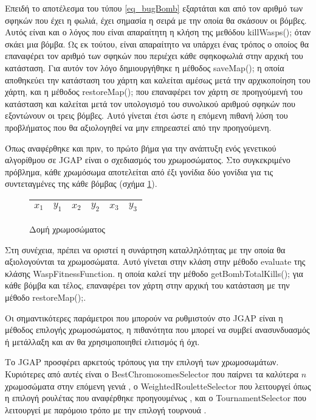 Επειδή το αποτέλεσμα του τύπου \ref{eq_bugBomb} εξαρτάται και από τον αριθμό των σφηκών που έχει η φωλιά, έχει σημασία η σειρά με την οποία θα σκάσουν οι βόμβες. Αυτός είναι και ο λόγος που είναι απαραίτητη η κλήση της μεθόδου killWasps(); όταν σκάει μια βόμβα. Ως εκ τούτου, είναι απαραίτητο να υπάρχει ένας τρόπος ο οποίος θα επαναφέρει τον αριθμό των σφηκών που περιέχει κάθε σφηκοφωλιά στην αρχική του κατάσταση. Για αυτόν τον λόγο δημιουργήθηκε η μέθοδος saveMap(); η οποία αποθηκεύει την κατάσταση του χάρτη και καλείται αμέσως μετά την αρχικοποίηση του χάρτη, και η μέθοδος restoreMap(); που επαναφέρει τον χάρτη σε προηγούμενή του κατάσταση και καλείται μετά τον υπολογισμό του συνολικού αριθμού σφηκών που εξοντώνουν οι τρεις βόμβες. Αυτό γίνεται έτσι ώστε η επόμενη πιθανή λύση του προβλήματος που θα αξιολογηθεί να μην επηρεαστεί από την προηγούμενη.

Όπως αναφέρθηκε και πριν, το πρώτο βήμα για την ανάπτυξη ενός γενετικού αλγορίθμου σε JGAP είναι ο σχεδιασμός του χρωμοσώματος. Στο συγκεκριμένο πρόβλημα, κάθε χρωμόσωμα αποτελείται από έξι γονίδια \textemdash{} δύο γονίδια για τις συντεταγμένες της κάθε βόμβας (σχήμα \ref{fig_chromosomeStructure}).

\begin{figure}[!t]
    \centering
    \begin{tabular}{|c|c|c|c|c|c|}
        \hline
        $x_1$ & $y_1$ & $x_2$ & $y_2$ & $x_3$ & $y_3$\\
        \hline
    \end{tabular}
    \caption{Δομή χρωμοσώματος}
    \label{fig_chromosomeStructure}
\end{figure}

Στη συνέχεια, πρέπει να οριστεί η συνάρτηση καταλληλότητας με την οποία θα αξιολογούνται τα χρωμοσώματα. Αυτό γίνεται στην κλάση στην μέθοδο evaluate της κλάσης WaspFitnessFunction. η οποία καλεί την μέθοδο get\-Bomb\-TotalKills(); για κάθε βόμβα και τέλος, επαναφέρει τον χάρτη στην αρχική του κατάσταση με την μέθοδο restore\-Map();.

Οι σημαντικότερες παράμετροι που μπορούν να ρυθμιστούν στο JGAP είναι η μέθοδος επιλογής χρωμοσώματος, η πιθανότητα που μπορεί να συμβεί ανασυνδυασμός ή μετάλλαξη και αν θα χρησιμοποιηθεί ελιτισμός ή όχι.

Το JGAP προσφέρει αρκετούς τρόπους για την επιλογή των χρωμοσωμάτων. Κυριότερες από αυτές είναι ο BestChromo\-somesSelector που παίρνει τα καλύτερα $n$ χρωμοσώματα στην επόμενη γενιά \cite{BCS}, ο WeightedRouletteSelector που λειτουργεί όπως η επιλογή ρουλέτας που αναφέρθηκε προηγουμένως \cite{WRS}, και ο TournamentSelector που λειτουργεί με παρόμοιο τρόπο με την επιλογή τουρνουά \cite{TS}.

